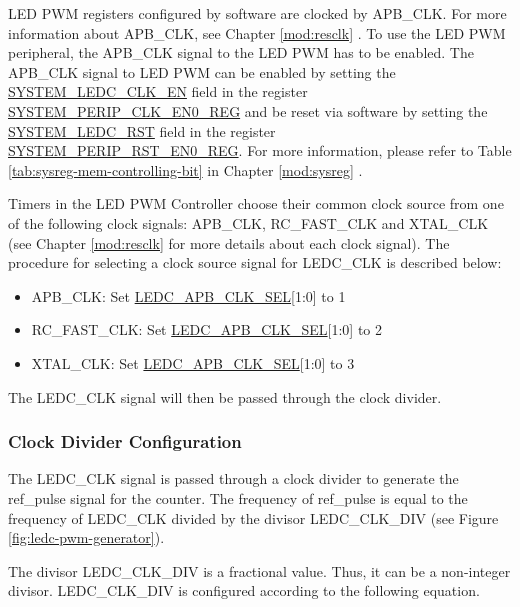 \documentclass[main\_\_EN.tex]{subfiles}
\begin{document}
LED PWM registers configured by software are clocked by APB\_CLK. For more information about APB\_CLK, see Chapter \ref{mod:resclk} \textit{}. To use the LED PWM peripheral, the APB\_CLK signal to the LED PWM has to be enabled. The APB\_CLK signal to LED PWM can be enabled by setting the  \hyperref[fielddesc:SYSTEMLEDCCLKEN]{SYSTEM\_LEDC\_CLK\_EN} field in the register \hyperref[regdesc:SYSTEMPERIPCLKEN0REG]{SYSTEM\_PERIP\_CLK\_EN0\_REG} and be reset via software by setting the \hyperref[fielddesc:SYSTEMLEDCRST]{SYSTEM\_LEDC\_RST} field in the register \hyperref[regdesc:SYSTEMPERIPRSTEN0REG]{SYSTEM\_PERIP\_RST\_EN0\_REG}. For more information, please refer to Table \ref{tab:sysreg-mem-controlling-bit} in Chapter \ref{mod:sysreg} \textit{}.

Timers in the LED PWM Controller choose their common clock source from one of the following clock signals: APB\_CLK, RC\_FAST\_CLK and XTAL\_CLK (see Chapter \ref{mod:resclk} \textit{} for more details about each clock signal). The procedure for selecting a clock source signal for LEDC\_CLK is described below:

\begin{itemize}
    \item APB\_CLK: Set \hyperref[fielddesc:LEDCAPBCLKSEL]{LEDC\_APB\_CLK\_SEL}[1:0] to 1
    \item RC\_FAST\_CLK: Set \hyperref[fielddesc:LEDCAPBCLKSEL]{LEDC\_APB\_CLK\_SEL}[1:0] to 2
    \item XTAL\_CLK: Set \hyperref[fielddesc:LEDCAPBCLKSEL]{LEDC\_APB\_CLK\_SEL}[1:0] to 3

\end{itemize}


The LEDC\_CLK signal will then be passed through the clock divider.

\subsubsection{Clock Divider Configuration}

The LEDC\_CLK signal is passed through a clock divider to generate the ref\_pulse signal for the counter. The frequency of ref\_pulse is equal to the frequency of LEDC\_CLK divided by the divisor LEDC\_CLK\_DIV (see Figure \ref{fig:ledc-pwm-generator}).

The divisor LEDC\_CLK\_DIV is a fractional value. Thus, it can be a non-integer divisor. LEDC\_CLK\_DIV is configured according to the following equation.
\end{document}
